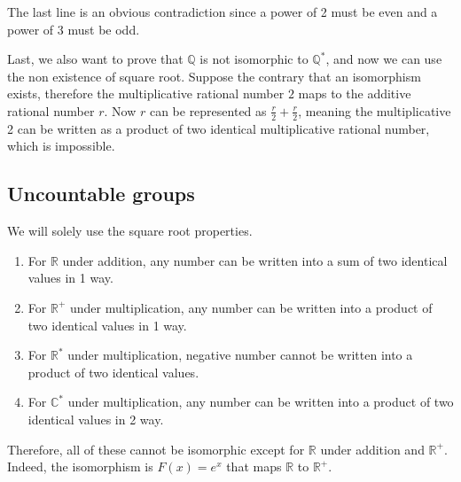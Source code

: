 The last line is an obvious contradiction since a power of 2 must be even and a power of 3 must be odd.

Last, we also want to prove that $ \mathbb{Q} $ is not isomorphic to $ \mathbb{Q}^* $, and now we can use the non existence of square root. Suppose the contrary that an isomorphism exists, therefore the multiplicative rational number $ 2 $ maps to the additive rational number $ r $. Now $ r $ can be represented as $ \frac{r}{2} + \frac{r}{2} $, meaning the multiplicative 2 can be written as a product of two identical multiplicative rational number, which is impossible.

\subsection*{Uncountable groups}
We will solely use the square root properties. 

\begin{enumerate}
  \item{For $ \mathbb{R} $ under addition, any number can be written into a sum of two identical values in 1 way.}
  \item{For $ \mathbb{R}^+ $ under multiplication, any number can be written into a product of two identical values in 1 way.}
  \item{For $ \mathbb{R}^* $ under multiplication, negative number cannot be written into a product of two identical values.}
  \item{For $ \mathbb{C}^* $ under multiplication, any number can be written into a product of two identical values in 2 way.}
\end{enumerate}

Therefore, all of these cannot be isomorphic except for $ \mathbb{R} $ under addition and $ \mathbb{R}^+ $. Indeed, the isomorphism is $ F(x) = e^x $ that maps $ \mathbb{R} $ to $ \mathbb{R}^+ $.